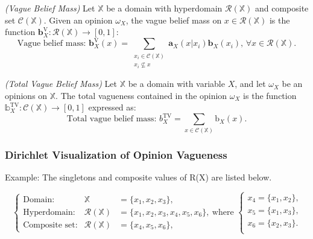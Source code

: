 \begin{definition}
    \emph{(Vague Belief Mass)} Let $\mathbb{X}$ be a domain with hyperdomain $\mathcal{R}(\mathbb{X})$ and composite set $\mathcal{C}(\mathbb{X})$. Given an
opinion $\omega_X$, the vague belief mass on $x \in \mathcal{R}(\mathbb{X})$ is the function $\mathbf{b}^\mathrm{V}_X : \mathcal{R}(\mathbb{X}) \rightarrow [0, 1]$:
    \begin{equation}
        \text{Vague belief mass: } \mathbf{b}^{\mathrm{V}}_X(x) = \sum\limits_{\substack{x_i \in \mathcal{C}(\mathbb{X}) \\ x_i \nsubseteq x}} \mathbf{a}_X(x | x_i) \mathbf{b}_X(x_i) \text{, } \forall x \in \mathcal{R}(\mathbb{X}) \text{.}
    \end{equation}
\end{definition}

\begin{definition}
    \emph{(Total Vague Belief Mass)} Let $\mathbb{X}$ be a domain with variable $X$, and
let $\omega_X$ be an opinions on $\mathbb{X}$. The total vagueness contained in the opinion $\omega_X$ is the
function $\mathbb{b}^{\mathrm{TV}}_X : \mathcal{C}(\mathbb{X}) \rightarrow [0, 1]$ expressed as:
    \begin{equation}
        \text{Total vague belief mass: } b^{\mathrm{TV}}_X = \sum\limits_{x \in \mathcal{C}(\mathbb{X})} \mathrm{b}_X(x) \text{.}
    \end{equation}
\end{definition}

\subsubsection{Dirichlet Visualization of Opinion Vagueness}

Example: The singletons and composite values of R(X) are listed below.

\begin{equation}
    \left\{\begin{array}{lll}
        \text{Domain:}        & \mathbb{X}              & = \{x_1, x_2, x_3\} \text{, } \\
        \text{Hyperdomain:}   & \mathcal{R}(\mathbb{X}) & = \{x_1, x_2, x_3, x_4, x_5, x_6\} \text{,} \\
        \text{Composite set:} & \mathcal{R}(\mathbb{X}) & = \{x_4, x_5, x_6\} \text{,}
    \end{array}\right. \text{where }
    \left\{\begin{array}{l}
        x_4 = \{x_1, x_2\} \text{,} \\
        x_5 = \{x_1, x_3\} \text{,} \\
        x_6 = \{x_2, x_3\} \text{.} \\
    \end{array}\right.
\end{equation}


